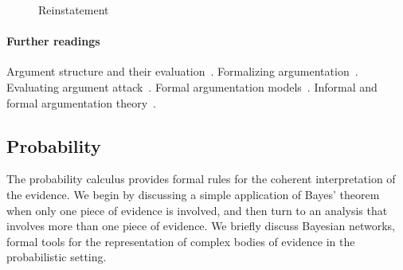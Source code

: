 \documentclass[10pt]{article}
\begin{document}
\begin{figure}[bt]
\centering

\caption{Reinstatement\label{fig:reinstatement}}
\end{figure}


\paragraph{Further readings}
Argument structure and their evaluation~\citep{pollock1995}. Formalizing argumentation~\citep{prakkenVreeswijk2002}. Evaluating argument attack~\citep{dung1995}. 
Formal argumentation models~\citep{simariLoui1992, vreeswijk1997, prakken2010, verheij2003deflog, gordonEtal2007}. Informal and formal argumentation theory~\citep{vanEemerenEtal2014}.





\subsection{Probability}

The probability calculus provides formal rules for the coherent interpretation of the evidence. We begin by discussing a simple application of Bayes' 
theorem when only one piece of evidence is involved, and then turn to an analysis that involves more than one piece of evidence. %
We briefly 
discuss Bayesian networks, formal tools for the representation of complex bodies of evidence in the probabilistic setting. 







\end{document}
